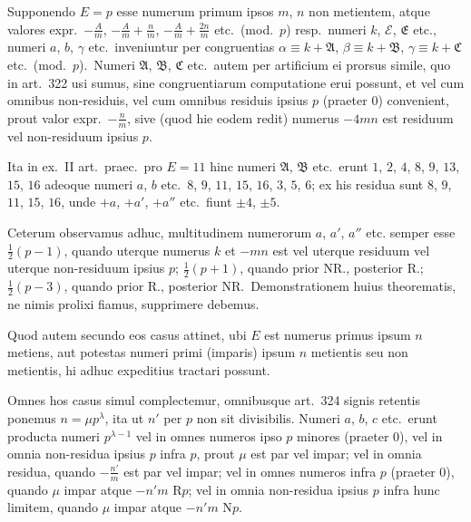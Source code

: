 \documentclass[12pt,a4paper]{article}
\theoremstyle{plain}
\theoremstyle{definition}
\theoremstyle{remark}
\begin{document}
Supponendo $E=p$ esse numerum primum ipsos $m$, $n$ non
metientem, atque valores expr.\ $-\frac{A}{m}$, $-\frac{A}{m}+\frac{n}{m}$, $-\frac{A}{m}+\frac{2n}{m}$ etc.\ (mod.\ $p$)
resp.\ numeri $k$, $\mathcal{E}$, $\mathfrak{E}$ etc., numeri $a$, $b$, $\gamma$ etc.\ inveniuntur per congruentias
$\alpha\equiv k+\mathfrak{A}$, $\beta\equiv k+\mathfrak{B}$, $\gamma\equiv k+\mathfrak{C}$ etc.\ (mod.\ $p$).\ Numeri $\mathfrak{A}$,
$\mathfrak{B}$, $\mathfrak{C}$ etc.\ autem per artificium ei prorsus simile, quo in art.\ 322 usi sumus,
sine congruentiarum computatione erui possunt, et vel cum omnibus
non-residuis, vel cum omnibus residuis ipsius $p$ (praeter 0) convenient, prout
valor expr.\ $-\frac{n}{m}$, sive (quod hie eodem redit) numerus $-4mn$ est residuum
vel non-residuum ipsius $p$.

Ita in ex.\ II art.\ praec.\ pro $E=11$ hinc numeri $\mathfrak{A}$, $\mathfrak{B}$ etc.\ erunt
$1$, $2$, $4$, $8$, $9$, $13$, $15$, $16$ adeoque numeri $a$, $b$ etc.\ $8$, $9$, $11$, $15$, $16$,
$3$, $5$, $6$; ex his residua sunt $8$, $9$, $11$, $15$, $16$, unde $+a$, $+a'$, $+a''$ etc.\ fiunt $\pm 4$, $\pm 5$.

Ceterum observamus adhuc, multitudinem numerorum $a$, $a'$, $a''$ etc.
semper esse $\frac{1}{2}(p-1)$, quando uterque numerus $k$ et $-mn$ est vel uterque
residuum vel uterque non-residuum ipsius $p$; $\frac{1}{2}(p+1)$, quando prior NR.,
posterior R.; $\frac{1}{2}(p-3)$, quando prior R., posterior NR.\ Demonstrationem
huius theorematis, ne nimis prolixi fiamus, supprimere debemus.

Quod autem secundo eos casus attinet, ubi $E$ est numerus primus ipsum
$n$ metiens, aut potestas numeri primi (imparis) ipsum $n$ metientis seu non
metientis, hi adhuc expeditius tractari possunt.

Omnes hos casus simul complectemur, omnibusque art.\ 324 signis
retentis ponemus $n=\mu p^\lambda$, ita ut $n'$ per $p$ non sit divisibilis. Numeri $a$,
$b$, $c$ etc.\ erunt producta numeri $p^{\lambda-1}$ vel in omnes numeros ipso $p$
minores (praeter 0), vel in omnia non-residua ipsius $p$ infra $p$, prout
$\mu$ est par vel impar; vel in omnia residua, quando $-\frac{n'}{m}$ est par vel impar;
vel in omnes numeros infra $p$ (praeter 0), quando $\mu$ impar atque $-n'm$ R$p$;
vel in omnia non-residua ipsius $p$ infra hunc limitem, quando $\mu$ impar
atque $-n'm$ N$p$.
\end{document}
